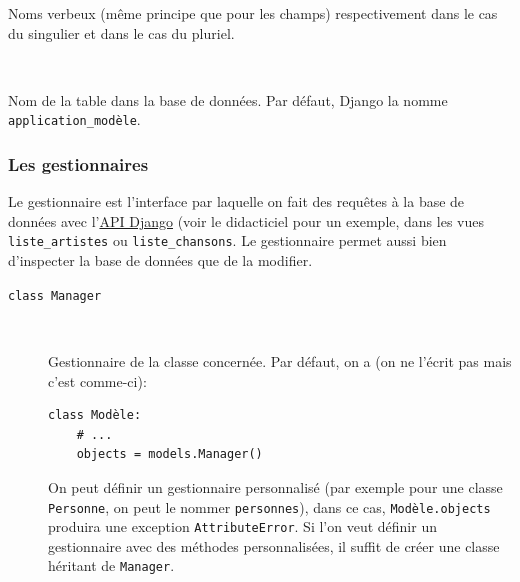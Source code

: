 \documentclass[a4paper, 10pt]{article}
\begin{document}
{\begin{description}
    Noms verbeux (même principe que pour les champs) respectivement dans le cas du singulier et dans le cas du pluriel.

    \item[\texttt{db_table}]~

    Nom de la table dans la base de données. Par défaut, Django la nomme \texttt{application\_modèle}.
\end{description}

\subsubsection{Les gestionnaires}
Le gestionnaire  est l'interface par laquelle on fait des requêtes à la base de données avec l'\href{https://docs.djangoproject.com/fr/2.0/topics/db/queries/}{API Django} (voir le didacticiel pour un exemple, dans les vues \texttt{liste\_artistes} ou \texttt{liste\_chansons}. Le gestionnaire permet aussi bien d'inspecter la base de données que de la modifier.

\begin{description}
    \item[\texttt{class Manager}]~

    Gestionnaire de la classe concernée. Par défaut, on a (on ne l'écrit pas mais c'est comme-ci):
    \begin{verbatim}
class Modèle:
    # ...
    objects = models.Manager()
    \end{verbatim}

    On peut définir un gestionnaire personnalisé (par exemple pour une classe \texttt{Personne}, on peut le nommer \texttt{personnes}), dans ce cas, \texttt{Modèle.objects} produira une exception \texttt{AttributeError}. Si l'on veut définir un gestionnaire avec des méthodes personnalisées, il suffit de créer une classe héritant de \texttt{Manager}.
\end{description}

}
\end{document}
